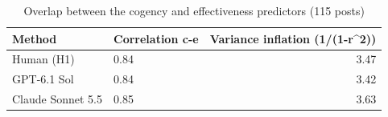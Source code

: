 \begin{table}[htbp]
\centering
\small
\caption{Overlap between the cogency and effectiveness predictors (115 posts)}
\label{tab:S2_collinearity}
\begin{tabular}{llr}
\toprule
Method & Correlation c-e & Variance inflation (1/(1-r\textasciicircum{}2)) \\
\midrule
Human (H1) & 0.84 & 3.47 \\
GPT-6.1 Sol & 0.84 & 3.42 \\
Claude Sonnet 5.5 & 0.85 & 3.63 \\
\bottomrule
\end{tabular}
\end{table}
